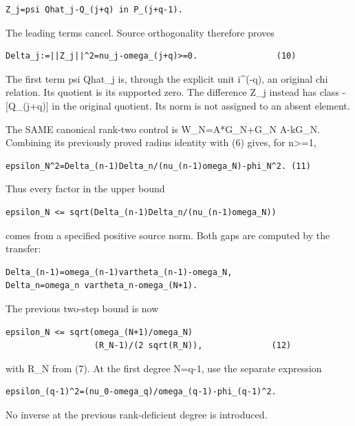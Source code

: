 \begin{verbatim}
Z_j=psi Qhat_j-Q_(j+q) in P_(j+q-1).
\end{verbatim}

The leading terms cancel. Source orthogonality therefore proves

\begin{verbatim}
Delta_j:=||Z_j||^2=nu_j-omega_(j+q)>=0.                (10)
\end{verbatim}

The first term psi Qhat\_j is, through the explicit unit i\^{}(-q), an original chi relation. Its quotient is its supported zero. The difference Z\_j instead has class -{[}Q\_(j+q){]} in the original quotient. Its norm is not assigned to an absent element.

The SAME canonical rank-two control is W\_N=A*G\_N+G\_N A-kG\_N. Combining its previously proved radius identity with (6) gives, for n\textgreater=1,

\begin{verbatim}
epsilon_N^2=Delta_(n-1)Delta_n/(nu_(n-1)omega_N)-phi_N^2. (11)
\end{verbatim}

Thus every factor in the upper bound

\begin{verbatim}
epsilon_N <= sqrt(Delta_(n-1)Delta_n/(nu_(n-1)omega_N))
\end{verbatim}

comes from a specified positive source norm. Both gaps are computed by the transfer:

\begin{verbatim}
Delta_(n-1)=omega_(n-1)vartheta_(n-1)-omega_N,
Delta_n=omega_n vartheta_n-omega_(N+1).
\end{verbatim}

The previous two-step bound is now

\begin{verbatim}
epsilon_N <= sqrt(omega_(N+1)/omega_N)
                  (R_N-1)/(2 sqrt(R_N)),              (12)
\end{verbatim}

with R\_N from (7). At the first degree N=q-1, use the separate expression

\begin{verbatim}
epsilon_(q-1)^2=(nu_0-omega_q)/omega_(q-1)-phi_(q-1)^2.
\end{verbatim}

No inverse at the previous rank-deficient degree is introduced.

